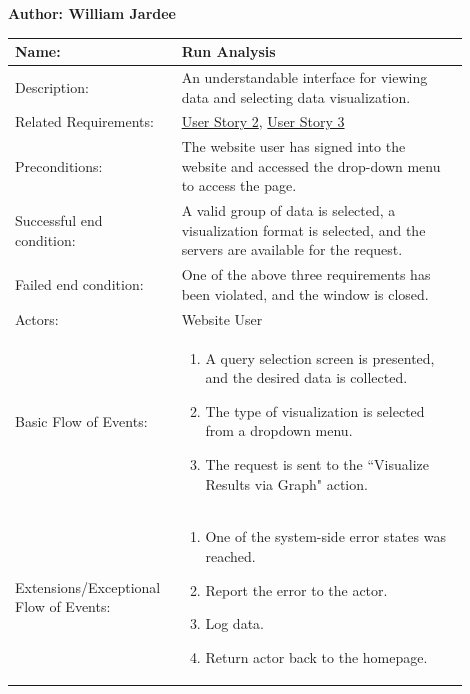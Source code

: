 \documentclass[11pt]{article}
\begin{document}
\begin{table}[!ht]
\begin{center}
\textbf{Author: William Jardee}
\vspace*{1em}

\begin{tabular}{p{0.30\linewidth}p{0.60\linewidth}}
	Name: & Run Analysis\\\hline
	Description: & An understandable interface for viewing data and selecting data visualization.\\\hline
	Related Requirements:& \hyperlink{us2}{User Story 2}, \hyperlink{us3}{User Story 3}\\\hline
	Preconditions:& The website user has signed into the website and accessed the drop-down menu to access the page. \\\hline
	Successful end condition:& A valid group of data is selected, a visualization format is selected, and the servers are available for the request.\\\hline
	Failed end condition:& One of the above three requirements has been violated, and the window is closed.\\\hline
	Actors:& Website User\\\hline
	Basic Flow of Events: & \begin{enumerate}
	\item A query selection screen is presented, and the desired data is collected.
	\item The type of visualization is selected from a dropdown menu.
	\item The request is sent to the ``Visualize Results via Graph" action.
	\end{enumerate}\\\hline
	Extensions/Exceptional Flow of Events: & \begin{enumerate}
	\item One of the system-side error states was reached.
	\item Report the error to the actor.
	\item Log data.
	\item Return actor back to the homepage.
	\end{enumerate}
\end{tabular}
\label{des:run_anal}	
\end{center}
\end{table}
\end{document}
